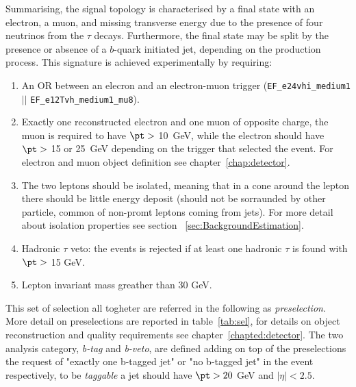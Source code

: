 Summarising, the signal topology is characterised by a final state with an
electron, a muon, and missing transverse energy due to the
presence of four neutrinos from the $\tau$ decays. Furthermore, the
final state may be split by the presence or
absence of a $b$-quark initiated jet, depending on the production
process. This signature is achieved experimentally by requiring:
\begin{enumerate}[label=(\roman*)]
\item An OR between an elecron and an electron-muon trigger (\verb=EF_e24vhi_medium1= $||$ \verb=EF_e12Tvh_medium1_mu8=).

\item Exactly one reconstructed electron and one muon of opposite charge, the muon is required to have $\pt > $ 10~GeV, while the electron 
should have $\pt > $ 15 or 25~GeV depending on the trigger that selected the event. For electron and muon object 
definition see chapter~\ref{chap:detector}.

\item The two leptons should be isolated, meaning that in a cone around the lepton there should be little energy deposit (should not be sorraunded by                 
other particle, common of non-promt leptons coming from jets). For more detail about isolation properties see section ~\ref{sec:BackgroundEstimation}.

\item Hadronic $\tau$ veto: the events is rejected if at least one hadronic $\tau$ is found with $\pt > $ 15 GeV.

\item Lepton invariant mass greather than 30 GeV.
\end{enumerate}
This set of selection all togheter are referred in the following as \emph{preselection}. More detail on preselections 
are reported in table~\ref{tab:sel}, for details on object reconstruction and quality requirements see chapter~\ref{chapted:detector}. 
The two analysis category, \emph{b-tag} and \emph{b-veto}, are defined adding on top of the preselections 
the request of "exactly one b-tagged jet" or "no b-tagged jet" in the event respectively, to be 
\emph{taggable} a jet should have $\pt > 20$ GeV and $|\eta| < 2.5$.


